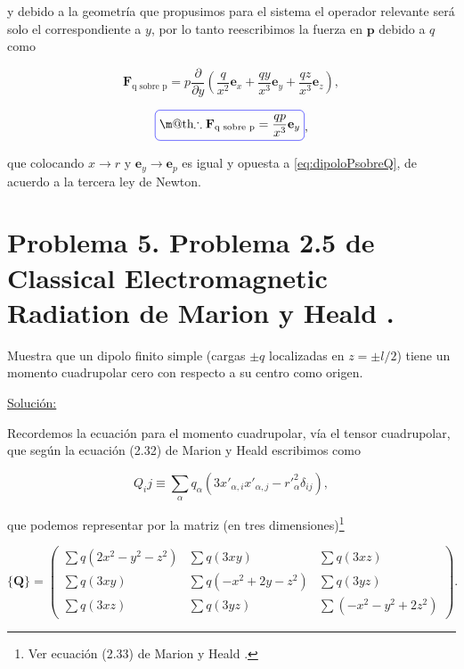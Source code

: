 \documentclass[a4paper,11pt]{article}
\makeatletter
\numberwithin{equation}{section}
\newcommand*{\boxcolor}{blue}
\renewcommand{\boxed}[1]{\textcolor{\boxcolor}{%
\tikz[baseline={([yshift=-1ex]current bounding box.center)}] \node [rectangle, minimum width=1ex,rounded corners,draw] {\normalcolor\m@th$\displaystyle#1$};}}
\makeatother
\begin{document}
y debido a la geometría que propusimos para el sistema el operador relevante 
será solo el correspondiente a $y$, por lo tanto reescribimos la fuerza en 
$\mathbf{p}$ debido a $q$ como 

\begin{equation}
 \mathbf{F}_{\text{q sobre p}} = p\frac{\partial}{\partial y}\left( \frac{q}{x^2} 
 \mathbf{e}_x + \frac{qy}{x^3}\mathbf{e}_y + \frac{qz}{x^3}\mathbf{e}_z\right),
\end{equation}
 
\begin{equation}
 \boxed{\therefore  \mathbf{F}_{\text{q sobre p}} = \frac{qp}{x^3}\mathbf{e}_y},
\end{equation}

que colocando $x \rightarrow r$ y $\mathbf{e}_y \rightarrow \mathbf{e}_p$ es igual y 
opuesta a \eqref{eq:dipoloPsobreQ}, de acuerdo a la tercera ley de Newton.

\newpage

\section{Problema 5. Problema 2.5 de Classical Electromagnetic Radiation
de Marion y Heald \cite{marion2}.}

Muestra que un dipolo finito simple (cargas $\pm q$ localizadas en $z = \pm l/2$) 
tiene un momento cuadrupolar cero con respecto a su centro como origen.

\vspace{.3cm}

\underline{Solución:} \vspace{.3cm}

Recordemos la ecuación para el momento cuadrupolar, vía el tensor cuadrupolar, 
que según la ecuación (2.32) de Marion y Heald \cite{marion2} escribimos como 

\begin{equation}
 Q_ij \equiv \sum_\alpha q_\alpha(3x'_{\alpha,i}x'_{\alpha,j} - r'^2_\alpha\delta_{ij}),
\end{equation}

que podemos representar por la matriz (en tres dimensiones)\footnote{Ver ecuación 
(2.33) de Marion y Heald \cite{marion2}.}


\begin{equation}
 \{ \mathbf{Q} \} = \begin{pmatrix}
                     \sum q(2x^2 - y^2 - z^2) & \sum q(3xy) & \sum q(3xz) \\
                     \sum q(3xy) & \sum q(-x^2 + 2y - z^2) & \sum q(3yz) \\
                     \sum q(3xz) & \sum q(3yz) & \sum(-x^2 - y^2 + 2z^2)
                    \end{pmatrix}.
\end{equation}
\end{document}
